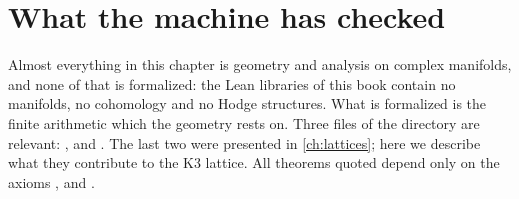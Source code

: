 \section{What the machine has checked}\label{sec:k3lattice:lean}

Almost everything in this chapter is geometry and analysis on complex manifolds, and none
of that is formalized: the Lean libraries of this book contain no manifolds, no cohomology
and no Hodge structures. What is formalized is the finite arithmetic which the geometry rests
on. Three files of the directory  are relevant:
,  and . The last two were
presented in \cref{ch:lattices}; here we describe what they contribute to the K3 lattice. All
theorems quoted depend only on the axioms ,  and
.

